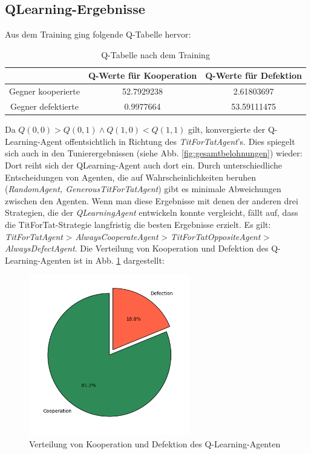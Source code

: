 \subsection{QLearning-Ergebnisse}
Aus dem Training ging folgende Q-Tabelle hervor:
\begin{table}[H]
    \centering
    \begin{tabular}{c|c|c}
            & Q-Werte für Kooperation & Q-Werte für Defektion \\
        \hline
        Gegner kooperierte &  52.7929238 & 2.61803697\\
        \hline
        Gegner defektierte &  0.9977664 & 53.59111475 \\
    \end{tabular}
    \caption{Q-Tabelle nach dem Training}
    \label{table:qtableaftertraining}
\end{table}
Da $Q(0, 0) > Q(0, 1) \land Q(1, 0) < Q(1, 1)$ gilt, konvergierte der Q-Learning-Agent offentsichtlich in Richtung des
\textit{TitForTatAgent}'s. Dies spiegelt sich auch in den Tunierergebnissen (siehe Abb. \ref{fig:gesamtbelohnungen}) wieder:
Dort reiht sich der QLearning-Agent auch dort ein. Durch unterschiedliche Entscheidungen von Agenten, die auf Wahrscheinlichkeiten 
beruhen (\textit{RandomAgent, \textit{GenerousTitForTatAgent}}) gibt es minimale Abweichungen zwischen den Agenten.
Wenn man diese Ergebnisse mit denen der anderen drei Strategien, die der \textit{QLearningAgent} entwickeln konnte vergleicht,
fällt auf, dass die TitForTat-Strategie langfristig die besten Ergebnisse erzielt. Es gilt:
\textit{TitForTatAgent} > \textit{AlwaysCooperateAgent} > \textit{TitForTatOppositeAgent} > \textit{AlwaysDefectAgent}.
Die Verteilung von Kooperation und Defektion des Q-Learning-Agenten ist in Abb. \ref{fig:qverteilung} dargestellt:
\begin{figure}[H]
    \centering
    \includegraphics[width=7cm]{../poster/logos/qPie.png}
    \caption{Verteilung von Kooperation und Defektion des Q-Learning-Agenten}
    \label{fig:qverteilung}
\end{figure}

